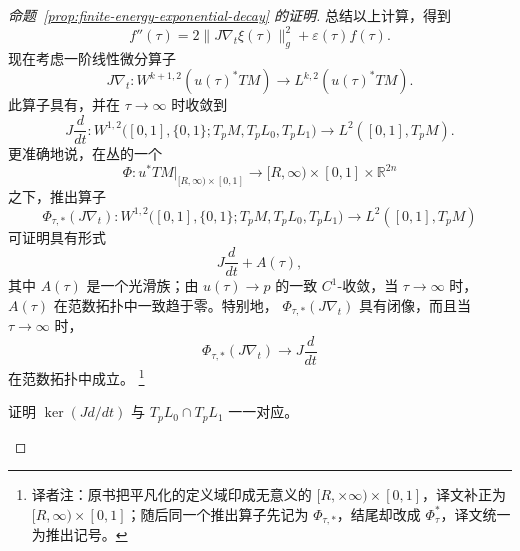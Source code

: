 \begin{proof}[命题~\ref{prop:finite-energy-exponential-decay} 的证明]
总结以上计算，得到
\begin{equation}
  f''(\tau)
  =2\|J\nabla_t\xi(\tau)\|_g^2
   +\varepsilon(\tau)f(\tau).
\label{eq:f-second-derivative}
\end{equation}
现在考虑一阶线性微分算子
\[
  J\nabla_t:
  W^{k+1,2}(u(\tau)^*TM)
  \longrightarrow
  L^{k,2}(u(\tau)^*TM).
\]
此算子具有\termClosedRange{}，并在 $\tau\to\infty$ 时收敛到
\[
  J\frac d{dt}:
  W^{1,2}\bigl([0,1],\{0,1\};T_pM,T_pL_0,T_pL_1\bigr)
  \longrightarrow
  L^2([0,1],T_pM).
\]
更准确地说，在丛的一个\termUnitaryTrivialization{}
\[
  \Phi:
  u^*TM|_{[R,\infty)\times[0,1]}
  \longrightarrow
  [R,\infty)\times[0,1]\times\mathbb R^{2n}
\]
之下，推出算子
\[
  \Phi_{\tau,*}(J\nabla_t):
  W^{1,2}\bigl([0,1],\{0,1\};T_pM,T_pL_0,T_pL_1\bigr)
  \longrightarrow
  L^2([0,1],T_pM)
\]
可证明具有形式
\[
  J\frac d{dt}+A(\tau),
\]
其中 $A(\tau)$ 是一个光滑\termCompactOperator{}族；由
$u(\tau)\to p$ 的一致 $C^1$-收敛，当 $\tau\to\infty$ 时，
$A(\tau)$ 在范数拓扑中一致趋于零。特别地，
$\Phi_{\tau,*}(J\nabla_t)$ 具有闭像，而且当 $\tau\to\infty$ 时，
\[
  \Phi_{\tau,*}(J\nabla_t)
  \longrightarrow J\frac d{dt}
\]
在范数拓扑中成立。
\footnote{译者注：原书把平凡化的定义域印成无意义的
$[R,\mathord\times\infty)\times[0,1]$，译文补正为
$[R,\infty)\times[0,1]$；随后同一个推出算子先记为 $\Phi_{\tau,*}$，结尾却改成
$\Phi_\tau^*$，译文统一为推出记号。}

\begin{exercise}
\label{ex:asymptotic-operator-kernel}
证明 $\ker(Jd/dt)$ 与 $T_pL_0\cap T_pL_1$ 一一对应。
\end{exercise}


\end{proof}
